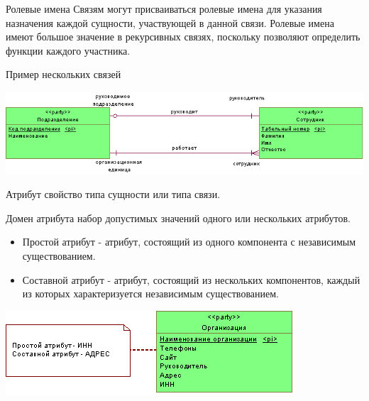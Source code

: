 \documentclass{beamer}
\begin{document}
\begin{frame}
\begin{block}{Ролевые имена}
Связям могут присваиваться ролевые имена для указания назначения каждой
сущности, участвующей в данной связи. Ролевые имена имеют большое значение в
рекурсивных связях, поскольку позволяют определить функции каждого участника.
\end{block}
\begin{block}{Пример нескольких связей}
\begin{center}
\includegraphics[scale=0.6]{images/role-01.png}
\end{center}
\end{block}
\end{frame}

\begin{frame}
\begin{block}{Атрибут}
свойство типа сущности или типа связи.
\end{block}
\begin{block}{Домен атрибута}
набор допустимых значений одного или нескольких атрибутов.
\end{block}
\begin{itemize}
\item Простой атрибут - атрибут, состоящий из одного компонента с независимым существованием.
\item Составной атрибут - атрибут, состоящий из нескольких компонентов, каждый из которых характеризуется независимым существованием.
\end{itemize}
\begin{center}
\includegraphics[scale=0.6]{images/simple-attr.png}
\end{center}
\end{frame}
\end{document}
